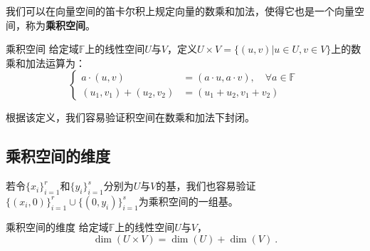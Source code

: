
\begin{issues}
\issueTODO
\end{issues}


我们可以在向量空间的笛卡尔积上规定向量的数乘和加法，使得它也是一个向量空间，称为\textbf{乘积空间}。

\begin{definition}{乘积空间}
给定域$\mathbb F $上的线性空间$U$与$V$，定义$U\times V=\{(u, v)|u \in U, v \in V\}$上的数乘和加法运算为：
\begin{equation}
\left\{\begin{aligned}
a \cdot (u, v) &= (a \cdot u, a \cdot v), \quad \forall a \in \mathbb F\\
(u_1, v_1) + (u_2, v_2) &= (u_1 + u_2, v_1 + v_2)
\end{aligned}\right.~
\end{equation}
\end{definition}
根据该定义，我们容易验证积空间在数乘和加法下封闭。

% 




\subsection{乘积空间的维度}

若令$\{x_i\}^r_{i=1}$和$\{y_i\}^s_{i=1}$分别为$U$与$V$的基，我们也容易验证$\{(x_i, 0)\}^r_{i=1}\cup \{(0, y_i)\}^s_{i=1}$为乘积空间的一组基。

\begin{theorem}{乘积空间的维度}
给定域$\mathbb F $上的线性空间$U$与$V$，
$$
\dim(U \times V) = \dim(U) + \dim(V)~.
$$
\end{theorem}

